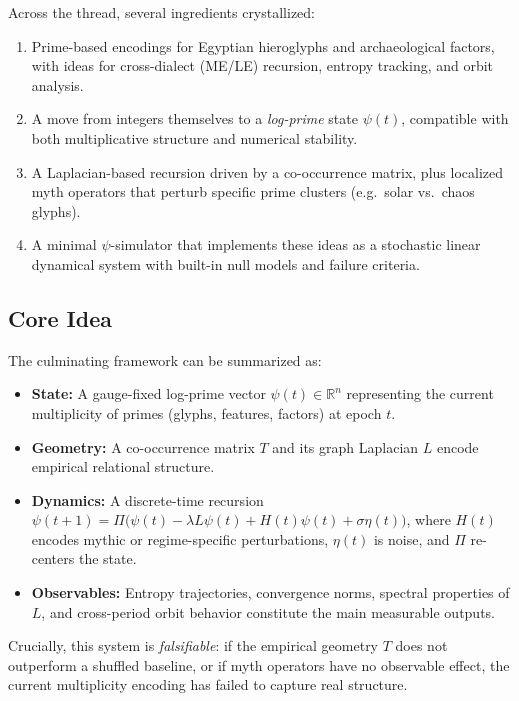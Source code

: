 \documentclass[11pt]{article}
\begin{document}
Across the thread, several ingredients crystallized:
\begin{enumerate}[nosep]
  \item Prime-based encodings for Egyptian hieroglyphs and archaeological
        factors, with ideas for cross-dialect (ME/LE) recursion,
        entropy tracking, and orbit analysis.
  \item A move from integers themselves to a \emph{log-prime} state
        \(\psi(t)\), compatible with both multiplicative structure and
        numerical stability.
  \item A Laplacian-based recursion driven by a co-occurrence matrix,
        plus localized myth operators that perturb specific prime clusters
        (e.g.\ solar vs.\ chaos glyphs).
  \item A minimal \(\psi\)-simulator that implements these ideas as a
        stochastic linear dynamical system with built-in null models
        and failure criteria.
\end{enumerate}

\subsection{Core Idea}

The culminating framework can be summarized as:

\begin{itemize}[nosep]
  \item \textbf{State:} A gauge-fixed log-prime vector
    \(\psi(t)\in\mathbb{R}^n\) representing the current multiplicity
    of primes (glyphs, features, factors) at epoch \(t\).
  \item \textbf{Geometry:} A co-occurrence matrix \(T\) and its graph
    Laplacian \(L\) encode empirical relational structure.
  \item \textbf{Dynamics:} A discrete-time recursion
    \(\psi(t+1) = \Pi\bigl(\psi(t) - \lambda L\psi(t) + H(t)\psi(t) +
    \sigma \eta(t)\bigr)\), where \(H(t)\) encodes mythic or regime-specific
    perturbations, \(\eta(t)\) is noise, and \(\Pi\) re-centers the state.
  \item \textbf{Observables:} Entropy trajectories, convergence norms,
    spectral properties of \(L\), and cross-period orbit behavior
    constitute the main measurable outputs.
\end{itemize}

Crucially, this system is \emph{falsifiable}: if the empirical geometry
\(T\) does not outperform a shuffled baseline, or if myth operators
have no observable effect, the current multiplicity encoding has
failed to capture real structure.
\end{document}
